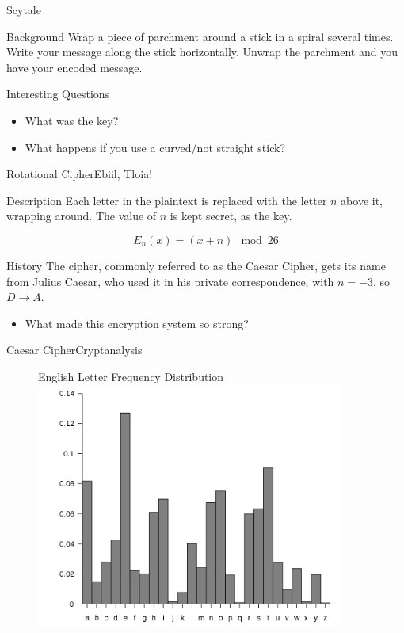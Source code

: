 \documentclass{beamer}
\begin{document}
\begin{frame}{Scytale}
	\begin{block}{Background}
		Wrap a piece of parchment around a stick in a spiral several times. Write your message along the stick horizontally. Unwrap the parchment and you have your encoded message.
	\end{block}
	\begin{block}{Interesting Questions}
		\begin{itemize}
			\item What was the key?
			\item What happens if you use a curved/not straight stick?
		\end{itemize}
	\end{block}
\end{frame}


\begin{frame}{Rotational Cipher}{Ebiil, Tloia!}
	\begin{block}{Description}
		Each letter in the plaintext is replaced with the letter $n$ above it,
		wrapping around. The value of $n$ is kept secret, as the key.

		\[ E_n(x) = (x+n)\mod 26 \]
	\end{block}

	\begin{block}{History}
		The cipher, commonly referred to as the Caesar Cipher, gets its name from Julius Caesar, who used it in his private
		correspondence, with $n = -3$, so $D \rightarrow A$.
		\begin{itemize}
			\item What made this encryption system so strong?
		\end{itemize}
	\end{block}
\end{frame}

\begin{frame}{Caesar Cipher}{Cryptanalysis}
	\begin{figure}
		{\centering English Letter Frequency Distribution}
		\includegraphics[width=0.9\textwidth]{letter-frequency.png}
	\end{figure}
\end{frame}
\end{document}
